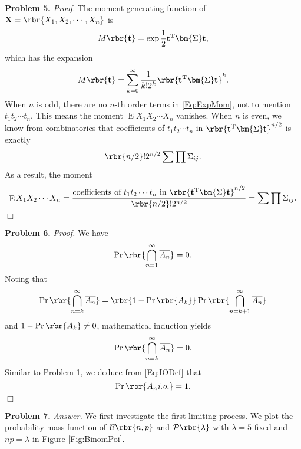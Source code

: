 \documentclass[english, nochinese]{pnote}
\DeclareMathOperator\oppr{\mathrm{Pr}}
\DeclareMathOperator\ope{\mathrm{E}}
\begin{document}
\textbf{Problem 5.} \textit{Proof.} The moment generating function of $ \mathbf{X} = \rbr{ X_1, X_2, \cdots, X_n } $ is
\begin{equation}
M \rbr{\mathbf{t}} = \exp \frac{1}{2} \mathbf{t}^{\text{T}} \bm{\Sigma} \mathbf{t},
\end{equation}
which has the expansion
\begin{equation} \label{Eq:ExpMom}
M \rbr{\mathbf{t}} = \sum_{ k = 0 }^{\infty} \frac{1}{ k ! 2^k } \rbr{ \mathbf{t}^{\text{T}} \bm{\Sigma} \mathbf{t} }^k.
\end{equation}
When $n$ is odd, there are no $n$-th order terms in \eqref{Eq:ExpMom}, not to mention $ t_1 t_2 \cdots t_n $. This means the moment $ \ope X_1 X_2 \cdots X_n $ vanishes. When $n$ is even, we know from combinatorics that coefficients of $ t_1 t_2 \cdots t_n $ in $ \rbr{ \mathbf{t}^{\text{T}} \bm{\Sigma} \mathbf{t} }^{ n / 2 } $ is exactly
\begin{equation}
\rbr{ n / 2 } ! 2^{ n / 2 } \sum \prod \Sigma_{ i j }.
\end{equation}
As a result, the moment
\begin{equation}
\ope X_1 X_2 \cdots X_n = \frac{ \text{coefficients of $ t_1 t_2 \cdots t_n $ in } \rbr{ \mathbf{t}^{\text{T}} \bm{\Sigma} \mathbf{t} }^{ n /2 } }{ \rbr{ n / 2 } ! 2^{ n / 2 } } = \sum \prod \Sigma_{ i j }.
\end{equation}
\hfill$\Box$

\textbf{Problem 6.} \textit{Proof.} We have
\begin{equation}
\oppr \rbr{ \bigcap_{ n = 1 }^{\infty} \overline{A_n} } = 0.
\end{equation}
Noting that
\begin{equation}
\oppr \rbr{ \bigcap_{ n = k }^{\infty} \overline{A_n} } = \rbr{ 1 - \oppr \rbr{A_k} } \oppr \rbr{ \bigcap_{ n = k + 1 }^{\infty} \overline{A_n} }
\end{equation}
and $ 1 - \oppr \rbr{A_k} \neq 0 $, mathematical induction yields
\begin{equation}
\oppr \rbr{ \bigcap_{ n = k }^{\infty} \overline{A_n} } = 0.
\end{equation}
Similar to Problem 1, we deduce from \eqref{Eq:IODef} that
\begin{equation}
\oppr \rbr{ A_n \textit{i.o.} } = 1.
\end{equation}
\hfill$\Box$

\textbf{Problem 7.} \textit{Answer.} We first investigate the first limiting process. We plot the probability mass function of $ \mathcal{B} \rbr{ n, p } $ and $ \mathcal{P} \rbr{\lambda} $ with $ \lambda = 5 $ fixed and $ n p = \lambda $ in Figure \ref{Fig:BinomPoi}.
\end{document}
